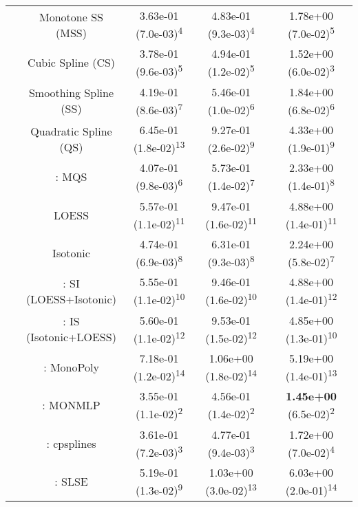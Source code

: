\begin{tabular}{ccccc}
&Monotone SS (MSS)& 3.63e-01 (7.0e-03)\textsuperscript{4}& 4.83e-01 (9.3e-03)\textsuperscript{4}& 1.78e+00 (7.0e-02)\textsuperscript{5}\tabularnewline
&Cubic Spline (CS)& 3.78e-01 (9.6e-03)\textsuperscript{5}& 4.94e-01 (1.2e-02)\textsuperscript{5}& 1.52e+00 (6.0e-02)\textsuperscript{3}\tabularnewline
&Smoothing Spline (SS)& 4.19e-01 (8.6e-03)\textsuperscript{7}& 5.46e-01 (1.0e-02)\textsuperscript{6}& 1.84e+00 (6.8e-02)\textsuperscript{6}\tabularnewline
&Quadratic Spline (QS)& 6.45e-01 (1.8e-02)\textsuperscript{13}& 9.27e-01 (2.6e-02)\textsuperscript{9}& 4.33e+00 (1.9e-01)\textsuperscript{9}\tabularnewline
&\textcite{heMonotoneBsplineSmoothing1998}: MQS& 4.07e-01 (9.8e-03)\textsuperscript{6}& 5.73e-01 (1.4e-02)\textsuperscript{7}& 2.33e+00 (1.4e-01)\textsuperscript{8}\tabularnewline
&LOESS& 5.57e-01 (1.1e-02)\textsuperscript{11}& 9.47e-01 (1.6e-02)\textsuperscript{11}& 4.88e+00 (1.4e-01)\textsuperscript{11}\tabularnewline
&Isotonic& 4.74e-01 (6.9e-03)\textsuperscript{8}& 6.31e-01 (9.3e-03)\textsuperscript{8}& 2.24e+00 (5.8e-02)\textsuperscript{7}\tabularnewline
&\textcite{mammenEstimatingSmoothMonotone1991}: SI (LOESS+Isotonic)& 5.55e-01 (1.1e-02)\textsuperscript{10}& 9.46e-01 (1.6e-02)\textsuperscript{10}& 4.88e+00 (1.4e-01)\textsuperscript{12}\tabularnewline
&\textcite{mammenEstimatingSmoothMonotone1991}: IS (Isotonic+LOESS)& 5.60e-01 (1.1e-02)\textsuperscript{12}& 9.53e-01 (1.5e-02)\textsuperscript{12}& 4.85e+00 (1.3e-01)\textsuperscript{10}\tabularnewline
&\textcite{murrayFastFlexibleMethods2016}: MonoPoly& 7.18e-01 (1.2e-02)\textsuperscript{14}& 1.06e+00 (1.8e-02)\textsuperscript{14}& 5.19e+00 (1.4e-01)\textsuperscript{13}\tabularnewline
&\textcite{cannonMonmlpMultilayerPerceptron2017}: MONMLP& 3.55e-01 (1.1e-02)\textsuperscript{2}& 4.56e-01 (1.4e-02)\textsuperscript{2}& \textbf{1.45e+00} (6.5e-02)\textsuperscript{2}\tabularnewline
&\textcite{navarro-garciaConstrainedSmoothingOutofrange2023}: cpsplines& 3.61e-01 (7.2e-03)\textsuperscript{3}& 4.77e-01 (9.4e-03)\textsuperscript{3}& 1.72e+00 (7.0e-02)\textsuperscript{4}\tabularnewline
&\textcite{groeneboomConfidenceIntervalsMonotone2023}: SLSE& 5.19e-01 (1.3e-02)\textsuperscript{9}& 1.03e+00 (3.0e-02)\textsuperscript{13}& 6.03e+00 (2.0e-01)\textsuperscript{14}\tabularnewline
\bottomrule
\end{tabular}
